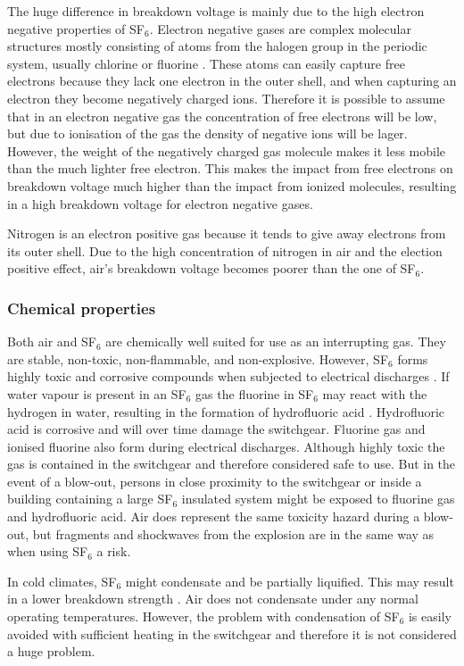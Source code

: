 \documentclass[10pt,a4paper]{article} %
\begin{document}
The huge difference in breakdown voltage is mainly due to the high electron negative properties of SF$_6$. Electron negative gases are complex molecular structures mostly consisting of atoms from the halogen group in the periodic system, usually chlorine or fluorine \cite{bib:TET4160HVIM}. These atoms can easily capture free electrons because they lack one electron in the outer shell, and when capturing an electron they become negatively charged ions. Therefore it is possible to assume that in an electron negative gas the concentration of free electrons will be low, but due to ionisation of the gas the density of negative ions will be lager. However, the weight of the negatively charged gas molecule makes it less mobile than the much lighter free electron. This makes the impact from free electrons on breakdown voltage much higher than the impact from ionized molecules, resulting in a high breakdown voltage for electron negative gases.

Nitrogen is an electron positive gas because it tends to give away electrons from its outer shell. Due to the high concentration of nitrogen in air and the election positive effect, air's breakdown voltage becomes poorer than the one of SF$_6$.

\subsubsection*{Chemical properties}
Both air and SF$_6$ are chemically well suited for use as an interrupting gas. They are stable, non-toxic, non-flammable, and non-explosive. However, SF$_6$ forms highly toxic and corrosive compounds when subjected to electrical discharges \cite{bib:SF6PI}. If water vapour is present in an SF$_6$ gas the fluorine in SF$_6$ may react with the hydrogen in water, resulting in the formation of hydrofluoric acid \cite{bib:SF6PI}. Hydrofluoric acid is corrosive and will over time damage the switchgear. Fluorine gas and ionised fluorine also form during electrical discharges. Although highly toxic the gas is contained in the switchgear and therefore considered safe to use. But in the event of a blow-out, persons in close proximity to the switchgear or inside a building containing a large SF$_6$ insulated system might be exposed to fluorine gas and hydrofluoric acid. Air does represent the same toxicity hazard during a blow-out, but fragments and shockwaves from the explosion are in the same way as when using SF$_6$ a risk.

In cold climates, SF$_6$ might condensate and be partially liquified. This may result in a lower breakdown strength \cite{bib:SF6PI}. Air does not condensate under any normal operating temperatures. However, the problem with condensation of SF$_6$ is easily avoided with sufficient heating in the switchgear and therefore it is not considered a huge problem.
\end{document}
